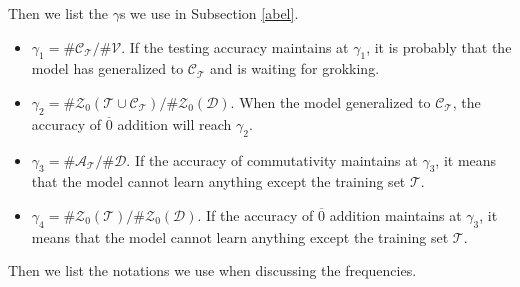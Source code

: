 \documentclass{article}
\begin{document}
Then we list the $\gamma$s we use in Subsection \ref{abel}.
\begin{itemize}
    \item $\gamma_1 = \#\mathcal{C_T} /\#\mathcal{V}$. If the testing accuracy maintains at $\gamma_1$, it is probably that the model has generalized to $\mathcal{C_T}$ and is waiting for grokking.

    \item $\gamma_2 = \#\mathcal{Z}_0(\mathcal{T}\cup\mathcal{C_T}) / \#\mathcal{Z}_0(\mathcal{D})$. When the model generalized to $\mathcal{C_T}$, the accuracy of $\overline{0}$ addition will reach $\gamma_2$.

    \item $\gamma_3 = \#\mathcal{A_T}/\#\mathcal{D}$. If the accuracy of commutativity maintains at $\gamma_3$, it means that the model cannot learn anything except the training set $\mathcal{T}$.

    \item $\gamma_4 = \#\mathcal{Z}_0(\mathcal{T})/\#\mathcal{Z}_0(\mathcal{D})$. If the accuracy of $\overline{0}$ addition maintains at $\gamma_3$, it means that the model cannot learn anything except the training set $\mathcal{T}$.
\end{itemize}

Then we list the notations we use when discussing the frequencies.
\end{document}

